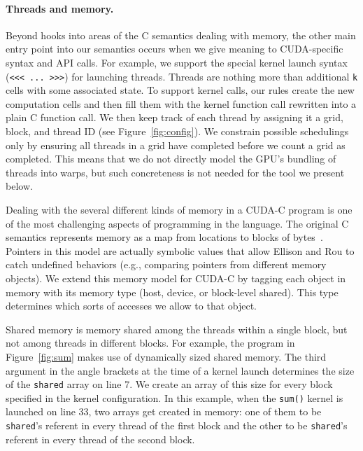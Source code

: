 \paragraph{Threads and memory.}
Beyond hooks into areas of the C semantics dealing with memory, the other main
entry point into our semantics occurs when we give meaning to CUDA-specific
syntax and API calls. For example, we support the special kernel launch syntax
(\verb|<<< ... >>>|) for launching threads. 
Threads are nothing more than additional {\tt k} cells with some associated
state. To support kernel calls, our rules create the new computation cells and
then fill them with the kernel function call rewritten into a plain C function
call.
We then keep track of each thread by assigning it a grid, block, and thread ID
(see Figure~\ref{fig:config}). We constrain possible schedulings only by
ensuring all threads in a grid have completed before we count a grid as
completed. This means that we do not directly model the GPU's bundling of
threads into warps, but such concreteness is not needed for the tool we present
below.

Dealing with the several different kinds of memory in a CUDA-C program is one of
the most challenging aspects of programming in the language. The original C
semantics represents memory as a map from locations to blocks of
bytes~\cite{ellison:popl12}. Pointers in this model are actually symbolic values
that allow Ellison and Rou to catch undefined behaviors (e.g., comparing
pointers from different memory objects). We extend this memory model for CUDA-C
by tagging each object in memory with its memory type (host, device, or
block-level shared). This type determines which sorts of accesses we allow to
that object.

Shared memory is memory shared among the threads within a single block, but not
among threads in different blocks. For example, the program in
Figure~\ref{fig:sum} makes use of dynamically sized shared memory. The third
argument in the angle brackets at the time of a kernel launch determines the
size of the {\tt shared} array on line 7. We create an array of this size for
every block specified in the kernel configuration. In this example, when the
{\tt sum()} kernel is launched on line 33, two arrays get created in memory: one
of them to be {\tt shared}'s referent in every thread of the first block and the
other to be {\tt shared}'s referent in every thread of the second block.

